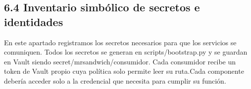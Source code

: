 \documentclass[10pt,letterpaper]{article}
\begin{document}
\begin{landscape}

\subsection*{6.4 Inventario simbólico de secretos e identidades}
En este apartado registramos los secretos necesarios para que los servicios se comuniquen. Todos los secretos se generan en scripts/\allowbreak{}bootstrap.\allowbreak{}py y se guardan en Vault siendo secret/\allowbreak{}mrsandwich/\allowbreak{}consumidor. Cada consumidor recibe un token de Vault propio cuya política solo permite leer su ruta.\allowbreak{}Cada componente debería acceder solo a la credencial que necesita para cumplir su función.


\end{landscape}
\end{document}
